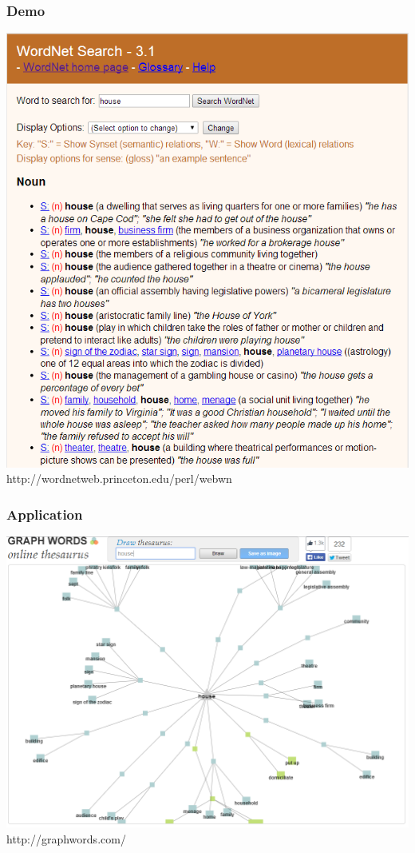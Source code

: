 \begin{frame}
\frametitle{Demo}
\includegraphics[scale=0.29]{img/wordnet_demo.png}\\
http://wordnetweb.princeton.edu/perl/webwn
\end{frame}

\begin{frame}
\frametitle{Application}
\includegraphics[scale=0.29]{img/wordnet_app.png}\\
http://graphwords.com/
\end{frame}

